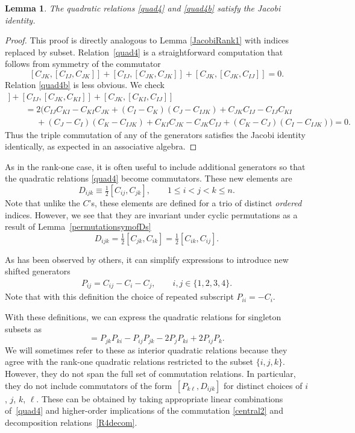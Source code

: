 \documentclass[10pt,a4paper]{amsart}
\numberwithin{equation}{section}
\newtheorem{Lemma}[Theorem]{Lemma}
\begin{document}
\begin{Lemma} \label{JacobiC} The quadratic relations \eqref{quad4} and \eqref{quad4b} satisfy the Jacobi identity.
\end{Lemma}
\begin{proof} This proof is directly analogous to Lemma \ref{JacobiRank1} with indices replaced by subset. Relation~\eqref{quad4} is a straightforward computation that follows from symmetry of the commutator
\[ [C_{JK},[C_{IJ}, C_{JK}]]+ [C_{IJ},[C_{JK}, C_{JK}]]+[C_{JK},[C_{JK},C_{IJ}]]=0.\]
Relation \eqref{quad4b} is less obvious. We check
\begin{gather*}
[C_{KI},[C_{IJ}, C_{JK}]]+ [C_{IJ},[C_{JK}, C_{KI}]]+[C_{JK},[C_{KI}, C_{IJ}]]\\
\qquad= 2  ( C_{IJ}C_{KI}-C_{KI}C_{JK}+(C_I-C_K)(C_J-C_{IJK}) + C_{JK}C_{IJ}-C_{IJ}C_{KI}  \\
\phantom{\qquad=}{}   +(C_J-C_I)(C_K-C_{IJK})+C_{KI}C_{JK}-C_{JK}C_{IJ}+(C_K-C_J)(C_I-C_{IJK}) ) = 0.
\end{gather*}
Thus the triple commutation of any of the generators satisfies the Jacobi identity identically, as expected in an associative algebra.
\end{proof}


As in the rank-one case, it is often useful to include additional generators so that the quadratic relations \eqref{quad4} become commutators. These new elements are
\[
 D_{ijk}\equiv\tfrac12 [C_{ij}, C_{jk}], \qquad 1\leq i< j< k \leq n.
\]
Note that unlike the $C$'s, these elements are defined for a trio of distinct \emph{ordered} indices. However, we see that they are invariant under cyclic permutations as a result of Lemma~\ref{permutationsymofDs}
\[
D_{ijk}=\tfrac12 [C_{jk}, C_{ik}]=\tfrac12 [C_{ik}, C_{ij}].
\]

As has been observed by others, it can simplify expressions to introduce new shifted generators{\samepage
\begin{gather}
P_{ij} =C_{ij}-C_i-C_j, \qquad i,j\in \{ 1,2,3,4\}.\label{P's}
\end{gather}
Note that with this definition the choice of repeated subscript $P_{ii} = -C_{i}$.}


With these definitions, we can express the quadratic relations for singleton subsets as
\begin{equation}
 [P_{jk},D_{ijk}]= P_{jk}P_{ki}-P_{ij}P_{jk}-2P_{j}P_{ki} +2P_{ij}P_k. \label{intquad}
 \end{equation}
We will sometimes refer to these as interior quadratic relations because they agree with the rank-one quadratic relations restricted to the subset $\{ i,j,k\}$. However, they do not span the full set of commutation relations. In particular, they do not include commutators of the form~$[P_{k\ell}, D_{ijk}]$ for distinct choices of $i$, $j$, $k$, $\ell$. These can be obtained by taking appropriate linear combinations of~\eqref{quad4} and higher-order implications of the commutation \eqref{central2} and decomposition relations~\eqref{R4decom}.
\end{document}
